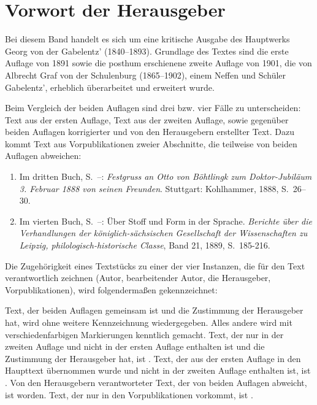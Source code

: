 \chapter*{Vorwort der Herausgeber}

Bei diesem Band handelt es sich um eine kritische Ausgabe des Hauptwerks Georg von der Gabelentz' (1840–1893). Grundlage des Textes sind die erste Auflage von 1891 sowie die posthum erschienene zweite Auflage von 1901, die von Albrecht Graf von der Schulenburg (1865–1902), einem Neffen und Schüler Gabelentz', erheblich überarbeitet und erweitert wurde. 

Beim Vergleich der beiden Auflagen sind drei bzw. vier Fälle zu unterscheiden: Text aus der ersten Auflage, Text aus der zweiten Auflage, sowie gegenüber beiden Auflagen korrigierter und von den Herausgebern erstellter Text. Dazu kommt Text aus Vorpublikationen zweier Abschnitte, die teilweise von beiden Auflagen abweichen:

\begin{enumerate}[1.]
\item \begin{sloppypar}Im dritten Buch, S.~\pageref{III.II.II.8}–\pageref{III.II.II.9}: \textit{Festgruss an Otto von Böhtlingk zum Doktor-Jubiläum 3. Februar 1888 von seinen Freunden}. Stuttgart: Kohlhammer, 1888, S.~26–30.\end{sloppypar}
\item Im vierten Buch, S.~\pageref{IV.III.II.1}–\pageref{IV.III.III}: Über Stoff und Form in der Sprache. \textit{Berichte über die Verhandlungen der königlich-sächsischen Gesellschaft der Wissenschaften zu Leipzig, philologisch-historische Classe}, Band 21, 1889, S.~185-216.
\end{enumerate}

Die Zugehörigkeit eines Textstücks zu einer der vier Instanzen, die für den Text verantwortlich zeichnen (Autor, bearbeitender Autor, die Herausgeber, Vorpublikationen), wird folgendermaßen gekennzeichnet:

Text, der beiden Auflagen gemeinsam ist und die Zustimmung der Herausgeber hat, wird ohne wei­tere Kennzeichnung wiedergegeben. Alles andere wird mit verschiedenfarbigen Mar­kierungen kenntlich gemacht. Text, der nur in der zweiten Auflage und nicht in der ersten Auflage enthalten ist und die Zustimmung der Herausgeber hat, ist . Text, der aus der ersten Auflage in den Haupttext übernommen wurde und nicht in der zweiten Auflage enthalten ist, ist . Von den Herausgebern verantworteter Text, der von beiden Auflagen abweicht, ist  worden. Text, der nur in den Vorpublikationen vorkommt, ist .


